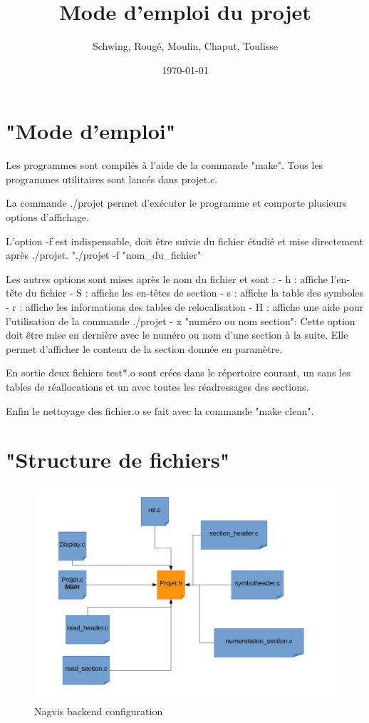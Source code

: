 \documentclass[12pt, a4paper]{article}
\title{Mode d'emploi du projet}
\author{Schwing, Roug\'e, Moulin, Chaput, Toulisse}
\date{\today}
\begin{document}
\maketitle

\section{"Mode d'emploi"}

Les programmes sont compilés à l'aide de la commande "make".
Tous les programmes utilitaires sont lancés dans projet.c.
		
La commande ./projet permet d'exécuter le programme et comporte plusieurs options d'affichage.

L'option -f est indispensable, doit être suivie du fichier étudié et mise directement après ./projet.	
"./projet -f "nom_du_fichier"

Les autres options sont mises après le nom du fichier et sont :
		- h : affiche l'en-tête du fichier
		- S : affiche les en-têtes de section
		- s : affiche la table des symboles
		- r : affiche les informations des tables de relocalisation
		- H : affiche une aide pour l'utilisation de la commande ./projet
		- x "numéro ou nom section": Cette option doit être mise en dernière avec le numéro ou nom d'une section à la suite.
					Elle permet d'afficher le contenu de la section donnée en paramètre.

En sortie deux fichiers test*.o sont crées dans le répertoire courant, un sans les tables de réallocations et un avec toutes les réadressages des sections.

Enfin le nettoyage des fichier.o se fait avec la commande "make clean".

\section{"Structure de fichiers"}
\begin{figure}[!h]
    \begin{center}
        \includegraphics[width=\textwidth]{archi_projet.jpg}
        \caption{Nagvis backend configuration}
    \end{center}
\end{figure}
\end{document}
